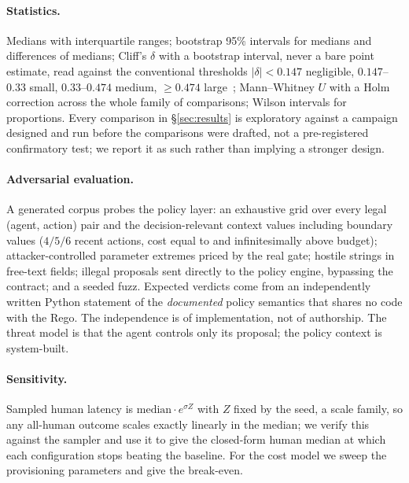 \paragraph{Statistics.}
Medians with interquartile ranges; bootstrap 95\% intervals for medians and differences of medians;
Cliff's $\delta$ with a bootstrap interval, never a bare point estimate, read against the conventional
thresholds $|\delta|<0.147$ negligible, $0.147$--$0.33$ small, $0.33$--$0.474$ medium, $\geq 0.474$
large~\cite{cliff1993}; Mann--Whitney $U$ with a Holm correction across the whole family of
comparisons; Wilson intervals for proportions. Every comparison in \S\ref{sec:results} is exploratory
against a campaign designed and run before the comparisons were drafted, not a pre-registered
confirmatory test; we report it as such rather than implying a stronger design.

\paragraph{Adversarial evaluation.}
A generated corpus probes the policy layer: an exhaustive grid over every legal (agent, action) pair
and the decision-relevant context values including boundary values ($4/5/6$ recent actions, cost
equal to and infinitesimally above budget); attacker-controlled parameter extremes priced by the real
gate; hostile strings in free-text fields; illegal proposals sent directly to the policy engine,
bypassing the contract; and a seeded fuzz. Expected verdicts come from an independently written
Python statement of the \emph{documented} policy semantics that shares no code with the Rego. The
independence is of implementation, not of authorship. The threat model is that the agent controls
only its proposal; the policy context is system-built.

\paragraph{Sensitivity.}
Sampled human latency is $\mathrm{median}\cdot e^{\sigma Z}$ with $Z$ fixed by the seed, a scale
family, so any all-human outcome scales exactly linearly in the median; we verify this against the
sampler and use it to give the closed-form human median at which each configuration stops beating the
baseline. For the cost model we sweep the provisioning parameters and give the break-even.
